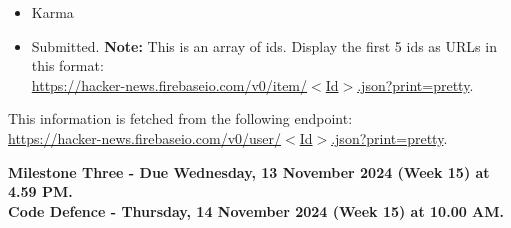 \documentclass{article}
\begin{document}
\begin{itemize}
\begin{itemize}
\begin{itemize}
		\item Karma
		\item Submitted. \textbf{Note:} This is an array of ids. Display the first 5 ids as URLs in this format:\\
		 \href{https://hacker-news.firebaseio.com/v0/item/$<$Id$>$.json?print=pretty}{https://hacker-news.firebaseio.com/v0/item/$<$Id$>$.json?print=pretty}.
	\end{itemize}
	This information is fetched from the following endpoint:\\
	\href{https://hacker-news.firebaseio.com/v0/user/$<$Id$>$.json?print=pretty}{https://hacker-news.firebaseio.com/v0/user/$<$Id$>$.json?print=pretty}.
	\end{itemize}
\end{itemize}
	\textbf{Milestone Three - Due Wednesday, 13  November 2024 (Week 15) at 4.59 PM. \\ Code Defence - Thursday, 14 November 2024 (Week 15) at 10.00 AM.}
\end{document}
